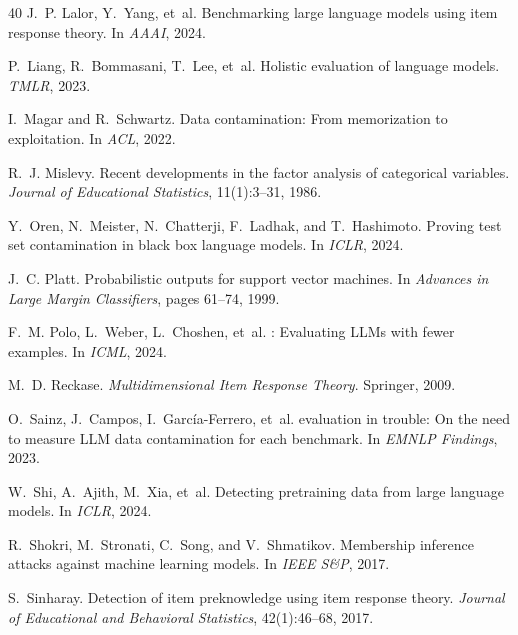\documentclass[11pt,a4paper]{article}
\begin{document}
\begin{thebibliography}{40}
J.~P. Lalor, Y.~Yang, et~al.
\newblock Benchmarking large language models using item response theory.
\newblock In \emph{AAAI}, 2024.

P.~Liang, R.~Bommasani, T.~Lee, et~al.
\newblock Holistic evaluation of language models.
\newblock \emph{TMLR}, 2023.

I.~Magar and R.~Schwartz.
\newblock Data contamination: From memorization to exploitation.
\newblock In \emph{ACL}, 2022.

R.~J. Mislevy.
\newblock Recent developments in the factor analysis of categorical variables.
\newblock \emph{Journal of Educational Statistics}, 11(1):3--31, 1986.

Y.~Oren, N.~Meister, N.~Chatterji, F.~Ladhak, and T.~Hashimoto.
\newblock Proving test set contamination in black box language models.
\newblock In \emph{ICLR}, 2024.

J.~C. Platt.
\newblock Probabilistic outputs for support vector machines.
\newblock In \emph{Advances in Large Margin Classifiers}, pages 61--74, 1999.

F.~M. Polo, L.~Weber, L.~Choshen, et~al.
: Evaluating {LLMs} with fewer examples.
\newblock In \emph{ICML}, 2024.

M.~D. Reckase.
\newblock \emph{Multidimensional Item Response Theory}.
\newblock Springer, 2009.

O.~Sainz, J.~Campos, I.~García-Ferrero, et~al.
 evaluation in trouble: On the need to measure {LLM} data contamination for each benchmark.
\newblock In \emph{EMNLP Findings}, 2023.

W.~Shi, A.~Ajith, M.~Xia, et~al.
\newblock Detecting pretraining data from large language models.
\newblock In \emph{ICLR}, 2024.

R.~Shokri, M.~Stronati, C.~Song, and V.~Shmatikov.
\newblock Membership inference attacks against machine learning models.
\newblock In \emph{IEEE S\&P}, 2017.

S.~Sinharay.
\newblock Detection of item preknowledge using item response theory.
\newblock \emph{Journal of Educational and Behavioral Statistics}, 42(1):46--68, 2017.


\end{thebibliography}
\end{document}
